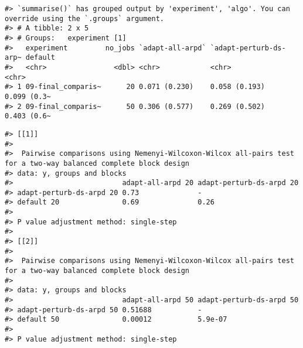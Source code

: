 \documentclass[
]{article}
\begin{document}
\begin{verbatim}
#> `summarise()` has grouped output by 'experiment', 'algo'. You can override using the `.groups` argument.
#> # A tibble: 2 x 5
#> # Groups:   experiment [1]
#>   experiment         no_jobs `adapt-all-arpd` `adapt-perturb-ds-arp~ default    
#>   <chr>                <dbl> <chr>            <chr>                  <chr>      
#> 1 09-final_comparis~      20 0.071 (0.230)    0.058 (0.193)          0.099 (0.3~
#> 2 09-final_comparis~      50 0.306 (0.577)    0.269 (0.502)          0.403 (0.6~
\end{verbatim}

\begin{verbatim}
#> [[1]]
#> 
#>  Pairwise comparisons using Nemenyi-Wilcoxon-Wilcox all-pairs test for a two-way balanced complete block design
#> data: y, groups and blocks
#>                          adapt-all-arpd 20 adapt-perturb-ds-arpd 20
#> adapt-perturb-ds-arpd 20 0.73              -                       
#> default 20               0.69              0.26
#> 
#> P value adjustment method: single-step
#> 
#> [[2]]
#> 
#>  Pairwise comparisons using Nemenyi-Wilcoxon-Wilcox all-pairs test for a two-way balanced complete block design
#> 
#> data: y, groups and blocks
#>                          adapt-all-arpd 50 adapt-perturb-ds-arpd 50
#> adapt-perturb-ds-arpd 50 0.51688           -                       
#> default 50               0.00012           5.9e-07
#> 
#> P value adjustment method: single-step
\end{verbatim}
\end{document}
